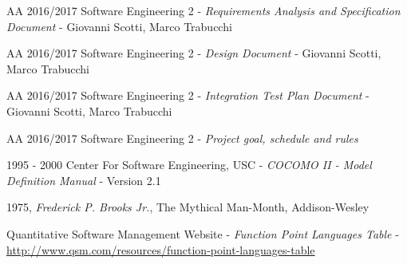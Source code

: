 \begin{thebibliography}{9}

	AA 2016/2017 Software Engineering 2 - \emph{Requirements Analysis and Specification Document} - Giovanni Scotti, Marco Trabucchi

	AA 2016/2017 Software Engineering 2 - \emph{Design Document} - Giovanni Scotti, Marco Trabucchi

	AA 2016/2017 Software Engineering 2 - \emph{Integration Test Plan Document} - Giovanni Scotti, Marco Trabucchi
	
	AA 2016/2017 Software Engineering 2 - \emph{Project goal, schedule and rules}
	
	1995 - 2000 Center For Software Engineering, USC - \emph{COCOMO II - Model Definition Manual} - Version 2.1
	
	1975, \textit{Frederick P. Brooks Jr.}, The Mythical Man-Month, Addison-Wesley
	
	Quantitative Software Management Website - \emph{Function Point Languages Table} - \url{http://www.qsm.com/resources/function-point-languages-table}

\end{thebibliography}